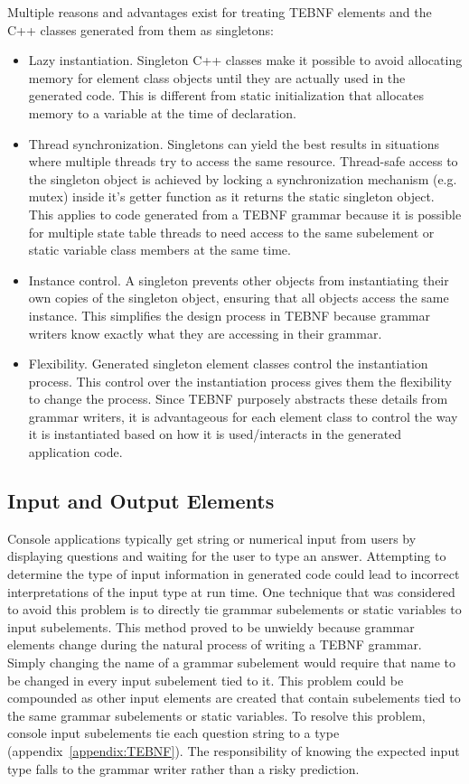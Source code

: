 \indent
Multiple reasons and advantages exist for treating TEBNF elements and the C++ classes generated from them as singletons:
\begin{itemize}
  \item Lazy instantiation.  Singleton C++ classes make it possible to avoid allocating memory for element class objects until they are actually used in the generated code.  This is different from static initialization that allocates memory to a variable at the time of declaration.
  \item Thread synchronization.   Singletons can yield the best results in situations where multiple threads try to access the same resource.  Thread-safe access to the singleton object is achieved by locking a synchronization mechanism (e.g. mutex) inside it's getter function as it returns the static singleton object.  This applies to code generated from a TEBNF grammar because it is possible for multiple state table threads to need access to the same subelement or static variable class members at the same time.
  \item Instance control.  A singleton prevents other objects from instantiating their own copies of the singleton object, ensuring that all objects access the same instance.  This simplifies the design process in TEBNF because grammar writers know exactly what they are accessing in their grammar.
  \item Flexibility.  Generated singleton element classes control the instantiation process.  This control over the instantiation process gives them the flexibility to change the process.  Since TEBNF purposely abstracts these details from grammar writers, it is advantageous for each element class to control the way it is instantiated based on how it is used/interacts in the generated application code.
\end{itemize}

\subsection{Input and Output Elements} \label{ssec:IoElements}
Console applications typically get string or numerical input from users by displaying questions and waiting for the user to type an answer.  Attempting to determine the type of input information in generated code could lead to incorrect interpretations of the input type at run time.  One technique that was considered to avoid this problem is to directly tie grammar subelements or static variables to input subelements.  This method proved to be unwieldy because grammar elements change during the natural process of writing a TEBNF grammar.  Simply changing the name of a grammar subelement would require that name to be changed in every input subelement tied to it.  This problem could be compounded as other input elements are created that contain subelements tied to the same grammar subelements or static variables.   To resolve this problem, console input subelements tie each question string to a type (appendix~\ref{appendix:TEBNF}).  The responsibility of knowing the expected input type falls to the grammar writer rather than a risky prediction.

